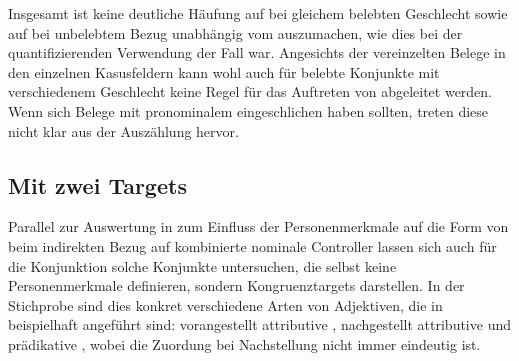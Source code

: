 Insgesamt ist keine deutliche Häufung auf  bei gleichem
belebten Geschlecht sowie auf  bei
unbelebtem Bezug unabhängig vom  auszumachen, wie dies
bei der quantifizierenden Verwendung der Fall war. Angesichts der vereinzelten
Belege in den einzelnen Kasusfeldern kann wohl auch für belebte
Konjunkte mit verschiedenem Geschlecht keine Regel für das Auftreten von
 abgeleitet werden. Wenn sich Belege mit pronominalem 
eingeschlichen haben sollten, treten diese nicht klar aus der Auszählung
hervor.


\subsection{Mit zwei Targets}
\label{subsec:caobeidkoordtarg}

Parallel zur Auswertung in  zum Einfluss
der Personenmerkmale auf die Form von  beim
indirekten Bezug auf kombinierte nominale Controller lassen sich auch für die
Konjunktion  solche Konjunkte untersuchen, die selbst keine
Personenmerkmale definieren, sondern Kongruenz\-targets darstellen. In der
Stichprobe sind dies konkret verschiedene Arten von Adjektiven, die in
 beispielhaft angeführt sind: vorangestellt
attributive , nachgestellt
attributive  und prädikative
, wobei die Zuordung bei
Nachstellung nicht immer eindeutig ist.

